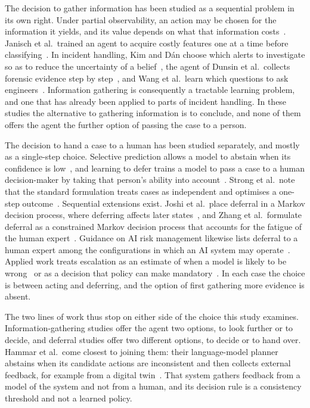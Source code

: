 The decision to gather information has been studied as a sequential problem in its own right. Under partial observability, an action may be chosen for the information it yields, and its value depends on what that information costs~\cite{kaelbling1998}. Janisch et al.\ trained an agent to acquire costly features one at a time before classifying~\cite{janisch2019}. In incident handling, Kim and D\'{a}n choose which alerts to investigate so as to reduce the uncertainty of a belief~\cite{kim2025}, the agent of Dunsin et al.\ collects forensic evidence step by step~\cite{dunsin2025}, and Wang et al.\ learn which questions to ask engineers~\cite{wang2023hrlhf}. Information gathering is consequently a tractable learning problem, and one that has already been applied to parts of incident handling. In these studies the alternative to gathering information is to conclude, and none of them offers the agent the further option of passing the case to a person.

The decision to hand a case to a human has been studied separately, and mostly as a single-step choice. Selective prediction allows a model to abstain when its confidence is low~\cite{geifman2019}, and learning to defer trains a model to pass a case to a human decision-maker by taking that person's ability into account~\cite{madras2018,hemmer2023}. Strong et al.\ note that the standard formulation treats cases as independent and optimises a one-step outcome~\cite{strong2025}. Sequential extensions exist. Joshi et al.\ place deferral in a Markov decision process, where deferring affects later states~\cite{joshi2023}, and Zhang et al.\ formulate deferral as a constrained Markov decision process that accounts for the fatigue of the human expert~\cite{zhang2026falcon}. Guidance on AI risk management likewise lists deferral to a human expert among the configurations in which an AI system may operate~\cite{nist2023}. Applied work treats escalation as an estimate of when a model is likely to be wrong~\cite{bachar2026} or as a decision that policy can make mandatory~\cite{pacella2026}. In each case the choice is between acting and deferring, and the option of first gathering more evidence is absent.

The two lines of work thus stop on either side of the choice this study examines. Information-gathering studies offer the agent two options, to look further or to decide, and deferral studies offer two different options, to decide or to hand over. Hammar et al.\ come closest to joining them: their language-model planner abstains when its candidate actions are inconsistent and then collects external feedback, for example from a digital twin~\cite{hammar2026llm}. That system gathers feedback from a model of the system and not from a human, and its decision rule is a consistency threshold and not a learned policy.

